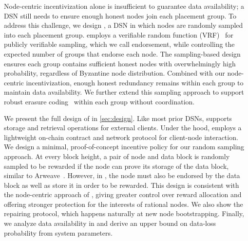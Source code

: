 Node-centric incentivization alone is insufficient to guarantee data availability;
a DSN still needs to ensure enough honest nodes join each placement group.
To address this challenge, we design \sys, a DSN in which nodes are randomly sampled into each placement group. %
\sys employs a verifiable random function (VRF)~\cite{vrf,vrf-rfc} for publicly verifiable sampling, which we call endorsement, while controlling the expected number of groups that endorse each node.
The sampling-based design ensures each group contains sufficient honest nodes with overwhelmingly high probability, regardless of Byzantine node distribution.
Combined with our node-centric incentivization, enough honest redundancy remains within each group to maintain data availability.
We further extend this sampling approach to support robust erasure coding~\cite{verify-rateless-ec} within each group without coordination.

We present the full design of \sys in \cref{sec:design}.
Like most prior DSNs, \sys supports storage and retrieval operations for external clients.
Under the hood, \sys employs a lightweight on-chain contract and network protocol for client-node interaction.
We design a minimal, proof-of-concept incentive policy for our random sampling approach.
At every block height, a pair of node and data block is randomly sampled to be rewarded if the node can prove its storage of the data block, similar to Arweave~\cite{arweave}.
However, in \sys, the node must also be endorsed by the data block as well as store it in order to be rewarded.
This design is consistent with the node-centric approach of \sys, giving \sys greater control over reward allocation and offering stronger protection for the interests of rational nodes.
We also show the repairing protocol, which happens naturally at new node bootstrapping.
Finally, we analyze data availability in \sys and derive an upper bound on data-loss probability from system parameters.

